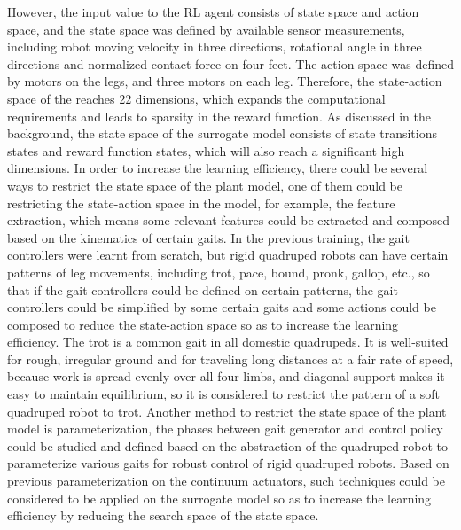  However, the input value to the \ac{RL} agent consists of state space and action space, and the state space was defined by available sensor measurements, including robot moving velocity in three directions, rotational angle in three directions and normalized contact force on four feet\cite{jiSynthesizingOptimalGait2022}. The action space was defined by motors on the legs, and three motors on each leg\cite{jiSynthesizingOptimalGait2022}. Therefore, the state-action space of the reaches 22 dimensions, which expands the computational requirements and leads to sparsity in the reward function. As discussed in the background, the state space of the surrogate model consists of state transitions states and reward function states, which will also reach a significant high dimensions. In order to increase the learning efficiency, there could be several ways to restrict the state space of the plant model, one of them could be restricting the state-action space in the model, for example, the feature extraction, which means some relevant features could be extracted and composed based on the kinematics of certain gaits. In the previous training\cite{jiSynthesizingOptimalGait2022}, the gait controllers were learnt from scratch, but rigid quadruped robots can have certain patterns of leg movements, including trot, pace, bound, pronk, gallop, etc.\cite{zhongAnalysisResearchQuadruped2019}, so that if the gait controllers could be defined on certain patterns, the gait controllers could be simplified by some certain gaits and some actions could be composed to reduce the state-action space so as to increase the learning efficiency\cite{owakiQuadrupedRobotExhibiting2017}. The trot is a common gait in all domestic quadrupeds\cite{jiOmnidirectionalWalkingQuadruped2022}. It is well-suited for rough, irregular ground and for traveling long distances at a fair rate of speed, because work is spread evenly over all four limbs, and diagonal support makes it easy to maintain equilibrium\cite{fletcherTrot2012}, so it is considered to restrict the pattern of a soft quadruped robot to trot. Another method to restrict the state space of the plant model is parameterization, the phases between gait generator and control policy could be studied and defined based on the abstraction of the quadruped robot to parameterize various gaits for robust control of rigid quadruped robots\cite{shaoLearningFreeGait2022}. Based on previous parameterization on the continuum actuators\cite{jiOmnidirectionalWalkingQuadruped2022}, such techniques could be considered to be applied on the surrogate model so as to increase the learning efficiency by reducing the search space of the state space.
